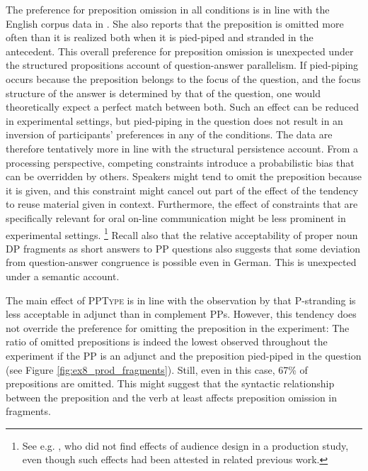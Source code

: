 The preference for preposition omission in all conditions is in line with the English corpus data in \citet{nykiel2017}. She also reports that the preposition is omitted more often than it is realized both when it is pied-piped and stranded in the antecedent. This overall preference for preposition omission is unexpected under the structured propositions account of question-answer parallelism. If pied-piping occurs because the preposition belongs to the focus of the question, and the focus structure of the answer is determined by that of the question, one would theoretically expect a perfect match between both. Such an effect can be reduced in experimental settings, but pied-piping in the question does not result in an inversion of participants' preferences in any of the conditions. The data are therefore tentatively more in line with the structural persistence account. From a processing perspective, competing constraints introduce a probabilistic bias that can be overridden by others. Speakers might tend to omit the preposition because it is given, and this constraint might cancel out part of the effect of the tendency to reuse material given in context. Furthermore, the effect of constraints that are specifically relevant for oral on-line communication might be less prominent in experimental settings.%
%
\footnote{See e.g. \citet{zhan.etal2017}, who did not find effects of audience design in a production study, even though such effects had been attested in related previous work.}\afterfn
%
Recall also that the relative acceptability of proper noun DP fragments as short answers to PP questions \citep{lemkeaccepted} also suggests that some deviation from question-answer congruence is possible even in German. This is unexpected under a semantic account.

The main effect of \textsc{PPType} is in line with the observation by \citet{vanriemsdijk1978} that P-stranding is less acceptable in adjunct than in complement PPs. However, this tendency does not override the preference for omitting the preposition in the experiment: The ratio of omitted prepositions is indeed the lowest observed throughout the experiment if the PP is an adjunct and the preposition pied-piped in the question (see Figure \ref{fig:ex8_prod_fragments}). Still, even in this case, 67\% of prepositions are omitted. This might suggest that the syntactic relationship between the preposition and the verb at least affects preposition omission in fragments.

